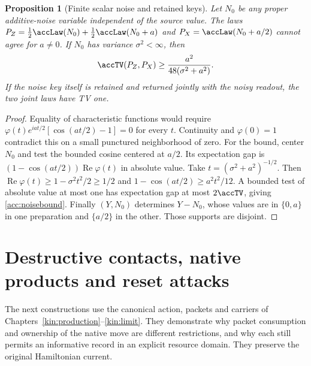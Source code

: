\documentclass[11pt,oneside,openany]{book}
\newtheorem{proposition}[theorem]{Proposition}
\theoremstyle{definition}
\theoremstyle{remark}\newtheorem{remark}[theorem]{Remark}
\begin{document}
\begin{proposition}[Finite scalar noise and retained keys]\label{acc:noise}
Let $N_0$ be any proper additive-noise variable independent of the source
value. The laws
$P_Z=\tfrac12\accLaw(N_0)+\tfrac12\accLaw(N_0+a)$ and
$P_X=\accLaw(N_0+a/2)$ cannot agree for $a\ne0$.
If $N_0$ has variance $\sigma^2<\infty$, then
\begin{equation}
 \accTV(P_Z,P_X)\ge\frac{a^2}{48(\sigma^2+a^2)}.
 \label{acc:noisebound}
\end{equation}
If the noise key itself is retained and returned jointly with the noisy
readout, the two joint laws have TV one.
\end{proposition}
\begin{proof}
Equality of characteristic functions would require
$\varphi(t)e^{iat/2}[\cos(at/2)-1]=0$ for every $t$.
Continuity and $\varphi(0)=1$ contradict this on a small punctured
neighborhood of zero. For the bound, center $N_0$ and test the bounded
cosine centered at $a/2$. Its expectation gap is
$(1-\cos(at/2))\operatorname{Re}\varphi(t)$ in absolute value.
Take $t=(\sigma^2+a^2)^{-1/2}$. Then
$\operatorname{Re}\varphi(t)\ge1-\sigma^2t^2/2\ge1/2$ and
$1-\cos(at/2)\ge a^2t^2/12$. A bounded test of absolute value at most
one has expectation gap at most $2\accTV$, giving \eqref{acc:noisebound}.
Finally $(Y,N_0)$ determines $Y-N_0$, whose values are in $\{0,a\}$ in
one preparation and $\{a/2\}$ in the other. Those supports are disjoint.
\end{proof}

\chapter{Destructive contacts, native products and reset attacks}
\label{acc:contacts}

The next constructions use the canonical action, packets and carriers of
Chapters~\ref{kin:production}--\ref{kin:limit}. They demonstrate why
packet consumption and ownership of the native move are different
restrictions, and why each still permits an informative record in an
explicit resource domain. They preserve the original Hamiltonian current.
\end{document}

